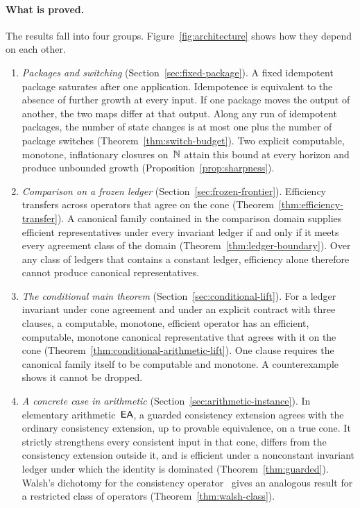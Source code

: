 \paragraph{What is proved.}
The results fall into four groups. Figure~\ref{fig:architecture} shows how they depend on each other.
\begin{enumerate}
\item \emph{Packages and switching} (Section~\ref{sec:fixed-package}). A fixed idempotent package saturates after one application. Idempotence is equivalent to the absence of further growth at every input. If one package moves the output of another, the two maps differ at that output. Along any run of idempotent packages, the number of state changes is at most one plus the number of package switches (Theorem~\ref{thm:switch-budget}). Two explicit computable, monotone, inflationary closures on~$\mathbb{N}$ attain this bound at every horizon and produce unbounded growth (Proposition~\ref{prop:sharpness}).
\item \emph{Comparison on a frozen ledger} (Section~\ref{sec:frozen-frontier}). Efficiency transfers across operators that agree on the cone (Theorem~\ref{thm:efficiency-transfer}). A canonical family contained in the comparison domain supplies efficient representatives under every invariant ledger if and only if it meets every agreement class of the domain (Theorem~\ref{thm:ledger-boundary}). Over any class of ledgers that contains a constant ledger, efficiency alone therefore cannot produce canonical representatives.
\item \emph{The conditional main theorem} (Section~\ref{sec:conditional-lift}). For a ledger invariant under cone agreement and under an explicit contract with three clauses, a computable, monotone, efficient operator has an efficient, computable, monotone canonical representative that agrees with it on the cone (Theorem~\ref{thm:conditional-arithmetic-lift}). One clause requires the canonical family itself to be computable and monotone. A counterexample shows it cannot be dropped.
\item \emph{A concrete case in arithmetic} (Section~\ref{sec:arithmetic-instance}). In elementary arithmetic~$\mathsf{EA}$, a guarded consistency extension agrees with the ordinary consistency extension, up to provable equivalence, on a true cone. It strictly strengthens every consistent input in that cone, differs from the consistency extension outside it, and is efficient under a nonconstant invariant ledger under which the identity is dominated (Theorem~\ref{thm:guarded}). Walsh's dichotomy for the consistency operator~\cite{Walsh2020Note} gives an analogous result for a restricted class of operators (Theorem~\ref{thm:walsh-class}).
\end{enumerate}

